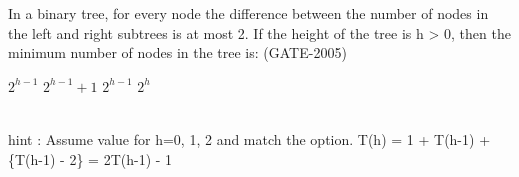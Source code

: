 \begin{questyle}
  \question  In a binary tree, for every node the difference between the number of nodes in the left and right subtrees is at most 2. If the height of the tree is h > 0, then the minimum number of nodes in the tree is:  (GATE-2005)

  \begin{oneparchoices}
    \choice         \(2^{h-1} \)
    \CorrectChoice  \(2^{h-1} + 1 \)
    \choice         \(2^{h-1} \)
    \choice         \(2^{h} \)
  \end{oneparchoices} \\
  hint : Assume value for h=0, 1, 2 and match the option. T(h) = 1 + T(h-1) + \{T(h-1) - 2\} = 2T(h-1) - 1
\end{questyle}


